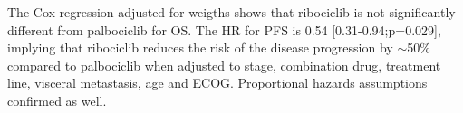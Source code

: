 The Cox regression adjusted for weigths shows that ribociclib is not significantly different from palbociclib for OS. The HR for PFS is 0.54 [0.31-0.94;p=0.029], implying that ribociclib reduces the risk of the disease progression by $\sim$50\% compared to palbociclib when adjusted to stage, combination drug, treatment line, visceral metastasis, age and ECOG. Proportional hazards assumptions confirmed as well.